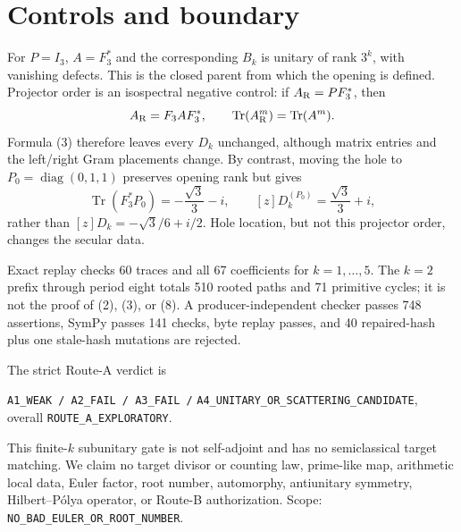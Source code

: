 \documentclass[10pt]{article}
\newcommand{\Tr}{\operatorname{Tr}}
\begin{document}
\section{Controls and boundary}
For $P=I_3$, $A=F_3^*$ and the corresponding $B_k$ is unitary of rank $3^k$,
with vanishing defects.  This is the closed parent from which the opening is
defined.  Projector order is an isospectral negative control: if
$A_{\rm R}=PF_3^*$, then
\[
 A_{\rm R}=F_3AF_3^*,\qquad
 \Tr(A_{\rm R}^m)=\Tr(A^m).
\]
Formula (3) therefore leaves every $D_k$ unchanged, although matrix entries
and the left/right Gram placements change.  By contrast, moving the hole to
$P_0=\operatorname{diag}(0,1,1)$ preserves opening rank but gives
\[
 \Tr(F_3^*P_0)=-\frac{\sqrt3}{3}-i,\qquad
 [z]D_k^{(P_0)}=\frac{\sqrt3}{3}+i,
\]
rather than $[z]D_k=-\sqrt3/6+i/2$.  Hole location, but not this projector
order, changes the secular data.

Exact replay checks 60 traces and all 67 coefficients for $k=1,\ldots,5$.
The $k=2$ prefix through period eight totals 510 rooted paths and 71 primitive
cycles; it is not the proof of (2), (3), or (8).  A producer-independent
checker passes 748 assertions, SymPy passes 141 checks, byte replay passes, and
40 repaired-hash plus one stale-hash mutations are rejected.

The strict Route-A verdict is
\begin{center}\small
\texttt{A1\_WEAK / A2\_FAIL / A3\_FAIL /}
\texttt{A4\_UNITARY\_OR\_SCATTERING\_CANDIDATE},\\[-2pt]
overall \texttt{ROUTE\_A\_EXPLORATORY}.
\end{center}
This finite-$k$ subunitary gate is not
self-adjoint and has no semiclassical target matching.  We claim no target
divisor or counting law, prime-like map, arithmetic local data, Euler factor,
root number, automorphy, antiunitary symmetry, Hilbert--P\'olya operator, or
Route-B authorization.  Scope:
\texttt{NO\_BAD\_EULER\_OR\_ROOT\_NUMBER}.
\end{document}
